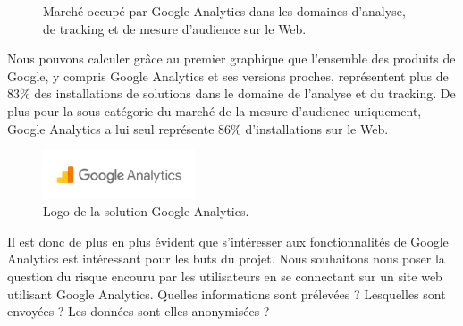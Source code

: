 		\begin{figure}[!h]
			\centering
			\caption{Marché occupé par Google Analytics dans les domaines d'analyse, de tracking et de mesure d'audience sur le Web.}
			\label{analytics-usage}
		\end{figure}

		Nous pouvons calculer grâce au premier graphique que l'ensemble des produits de Google, y compris Google Analytics et ses versions proches, représentent plus de 83\% des installations de solutions dans le domaine de l'analyse et du tracking. De plus pour la sous-catégorie du marché de la mesure d'audience uniquement, Google Analytics a lui seul représente 86\% d'installations sur le Web.

		\begin{figure}[ht]
			\centering
			\includegraphics[width=0.4\textwidth]{images/analysis/analytics}
			\caption{Logo de la solution Google Analytics\cite{analytics}.}
			\label{a-analytics}
		\end{figure}

		Il est donc de plus en plus évident que s'intéresser aux fonctionnalités de Google Analytics est intéressant pour les buts du projet. Nous souhaitons nous poser la question du risque encouru par les utilisateurs en se connectant sur un site web utilisant Google Analytics. Quelles informations sont prélevées ? Lesquelles sont envoyées ? Les données sont-elles anonymisées ?

